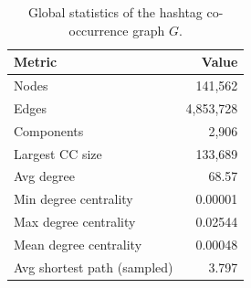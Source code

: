 \begin{table}[t]
\centering
\caption{Global statistics of the hashtag co-occurrence graph $G$.}
\label{tab:global}
\begin{tabular}{lr}
\toprule
Metric & Value \\
\midrule
Nodes & 141,562 \\
Edges & 4,853,728 \\
Components & 2,906 \\
Largest CC size & 133,689 \\
Avg degree & 68.57 \\
Min degree centrality & 0.00001 \\
Max degree centrality & 0.02544 \\
Mean degree centrality & 0.00048 \\
Avg shortest path (sampled) & 3.797 \\
\bottomrule
\end{tabular}
\end{table}
